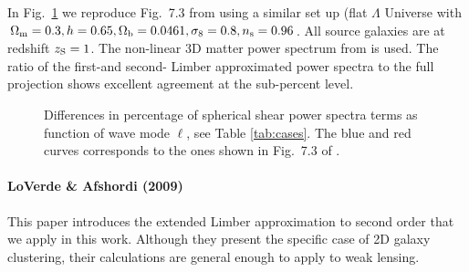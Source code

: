 \documentclass[useAMS,usenatbib]{mn2e} %
\begin{document}
\begin{appendix}
In Fig.~\ref{fig:L1L2E_Rijt} we reproduce Fig.~7.3 from \cite{vande2012} using
a similar set up (flat $\Lambda$ Universe with $\Omega_{\rm m} = 0.3, h=0.65,
\Omega_{\rm b} = 0.0461, \sigma_8 = 0.8, n_{\rm s} = 0.96$. All source galaxies
are at redshift $z_{\rm S} = 1$. The non-linear 3D matter power spectrum from
\cite{2012ApJ...761..152T} is used. The ratio of the first-and second- Limber approximated
power spectra to the full
projection shows excellent agreement at the sub-percent level.

\begin{figure}

  \begin{center}
  \end{center}

    \caption{Differences in percentage of spherical shear power spectra terms
    as function of wave mode $\ell$, see Table \ref{tab:cases}.
    The blue and red curves corresponds to the ones shown in Fig.~7.3 of \citet{vande2012}.
    }

    \label{fig:L1L2E_Rijt}

\end{figure}



\paragraph{LoVerde \& Afshordi (2009)}

This paper introduces the extended Limber approximation to second order that we
apply in this work. Although they present the specific case of 2D galaxy
clustering, their calculations are general enough to apply to weak lensing.


\end{appendix}
\end{document}
